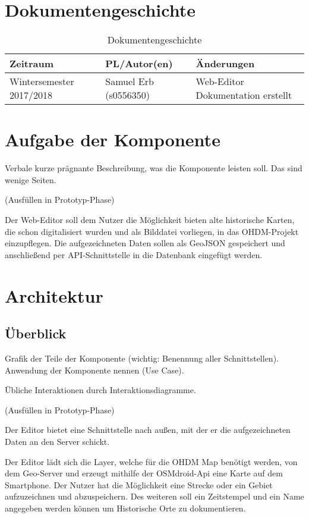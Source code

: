 \documentclass[a4paper, 12.5pt]{scrartcl}
\begin{document}
\section{Dokumentengeschichte}
\begin{table}[h]
    \begin{tabular}{|l|l|p{4cm}|}
        \hline
        Zeitraum & PL/Autor(en) & Änderungen \\
        \hline
        Wintersemester 2017/2018 & Samuel Erb (s0556350) &
        Web-Editor Dokumentation erstellt \newline

        \\
        \hline
    \end{tabular}
    \caption{Dokumentengeschichte}
\end{table}

\section{Aufgabe der Komponente}
Verbale kurze prägnante Beschreibung, was die Komponente leisten soll.
Das sind wenige Seiten.

(Ausfüllen in Prototyp-Phase)

Der Web-Editor soll dem Nutzer die Möglichkeit bieten alte historische Karten, die schon digitalisiert wurden und als Bilddatei vorliegen, in das OHDM-Projekt einzupflegen. Die aufgezeichneten Daten sollen als GeoJSON gespeichert und anschließend per API-Schnittstelle in die Datenbank eingefügt werden.


\section{Architektur}

\subsection{Überblick}
Grafik der Teile der Komponente (wichtig: Benennung aller Schnittstellen).
Anwendung der Komponente nennen (Use Case).

Übliche Interaktionen durch Interaktionsdiagramme.

(Ausfüllen in Prototyp-Phase)


Der Editor bietet eine Schnittstelle nach außen, mit der er die aufgezeichneten Daten an den Server schickt.

Der Editor lädt sich die Layer, welche für die OHDM Map benötigt werden, von dem Geo-Server und erzeugt mithilfe der OSMdroid-Api eine Karte auf dem Smartphone. Der Nutzer hat die Möglichkeit eine Strecke oder ein Gebiet aufzuzeichnen und abzuspeichern. Des weiteren soll ein Zeitstempel und ein Name angegeben werden können um Historische Orte zu dokumentieren.
\end{document}

